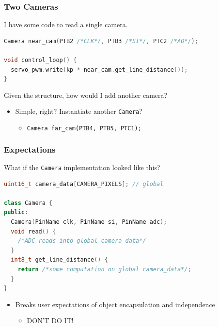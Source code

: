 \documentclass{beamer}
\begin{document}
\begin{frame}[fragile]
\frametitle{Two Cameras}
I have some code to read a single camera.
\vspace{10px}
\begin{lstlisting}[language=C++,basicstyle=\ttfamily\scriptsize]
Camera near_cam(PTB2 /*CLK*/, PTB3 /*SI*/, PTC2 /*AO*/);

void control_loop() {
  servo_pwm.write(kp * near_cam.get_line_distance());
}
\end{lstlisting}
\vspace{10px}
Given the structure, how would I add another camera?
\vspace{10px}
\begin{itemize}
  \item<2-> Simple, right? Instantiate another \texttt{Camera}?
  \begin{itemize}
    \item \texttt{Camera far\_cam(PTB4, PTB5, PTC1);}
  \end{itemize}
\end{itemize}
\vspace{10px}
\end{frame}

\begin{frame}[fragile]
\frametitle{Expectations}
What if the \texttt{Camera} implementation looked like this?
\vspace{10px}
\begin{lstlisting}[language=C++,basicstyle=\ttfamily\scriptsize]
uint16_t camera_data[CAMERA_PIXELS]; // global

class Camera {
public:
  Camera(PinName clk, PinName si, PinName adc);
  void read() {
    /*ADC reads into global camera_data*/
  }
  int8_t get_line_distance() {
    return /*some computation on global camera_data*/;
  }
}
\end{lstlisting}
\vspace{10px}
\begin{itemize}
  \item<2-> Breaks user expectations of object encapsulation and independence
  \begin{itemize}
    \item DON'T DO IT!
  \end{itemize}
\end{itemize}
\end{frame}
\end{document}
